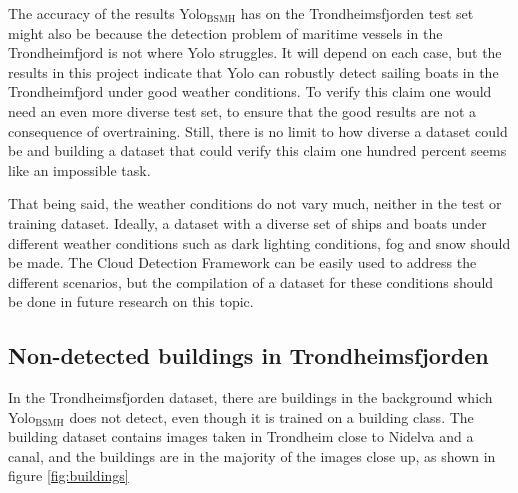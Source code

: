 \vspace{3mm}

\noindent
The accuracy of the results Yolo$_{\text{BSMH}}$ has on the Trondheimsfjorden test set might also be because the detection problem of maritime vessels in the Trondheimfjord is not where Yolo struggles. It will depend on each case, but the results in this project indicate that Yolo can robustly detect sailing boats in the Trondheimfjord under good weather conditions. To verify this claim one would need an even more diverse test set, to ensure that the good results are not a consequence of overtraining. Still, there is no limit to how diverse a dataset could be and building a dataset that could verify this claim one hundred percent seems like an impossible task. 

\vspace{3mm}
\noindent
That being said, the weather conditions do not vary much, neither in the test or training dataset. Ideally, a dataset with a diverse set of ships and boats under different weather conditions such as dark lighting conditions, fog and snow should be made. The Cloud Detection Framework can be easily used to address the different scenarios, but the compilation of a dataset for these conditions should be done in future research on this topic.






\newpage

\subsection{Non-detected buildings in Trondheimsfjorden}
\label{sec:build_trf}
In the Trondheimsfjorden dataset, there are buildings in the background which Yolo$_{\text{BSMH}}$ does not detect, even though it is trained on a building class. The building dataset contains images taken in Trondheim close to Nidelva and a canal, and the buildings are in the majority of the images close up, as shown in figure \ref{fig:buildings}

